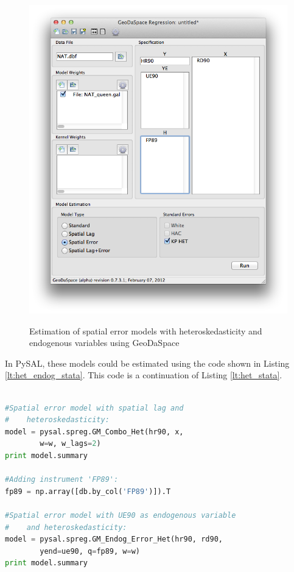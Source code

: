 \documentclass{article}
\begin{document}
\begin{figure}[htb]
\caption{Estimation of spatial error models with heteroskedasticity and endogenous variables using GeoDaSpace}
\label{f:GS_het_endog}
\begin{center}
\includegraphics[width=0.7\linewidth]{GS_het_endog.png}\\
\end{center}
\end{figure}


In PySAL, these models could be estimated using the code shown in Listing \ref{lt:het_endog_stata}. This code is a continuation of Listing \ref{lt:het_stata}.

\begin{code}
\begin{lstlisting}[label=lt:het_endog_stata,caption=Using PySAL to match the results of spatial error models with heteroskedasticity and endogenous variables or spatial lag from Stata,language=Python]

#Spatial error model with spatial lag and
#    heteroskedasticity:
model = pysal.spreg.GM_Combo_Het(hr90, x,
        w=w, w_lags=2)
print model.summary

#Adding instrument 'FP89':
fp89 = np.array([db.by_col('FP89')]).T

#Spatial error model with UE90 as endogenous variable
#    and heteroskedasticity:
model = pysal.spreg.GM_Endog_Error_Het(hr90, rd90,
        yend=ue90, q=fp89, w=w)
print model.summary

\end{lstlisting}
\end{code}
\FloatBarrier
\end{document}
